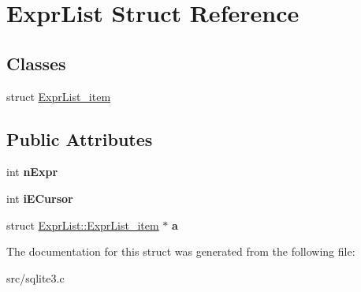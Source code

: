\hypertarget{struct_expr_list}{\section{Expr\-List Struct Reference}
\label{struct_expr_list}
}
\subsection*{Classes}
\begin{DoxyCompactItemize}
\item 
struct \hyperlink{struct_expr_list_1_1_expr_list__item}{Expr\-List\-\_\-item}
\end{DoxyCompactItemize}
\subsection*{Public Attributes}
\begin{DoxyCompactItemize}
\item 
\hypertarget{struct_expr_list_a88bdbd62cce306124eea63ae9f80ec33}{int {\bfseries n\-Expr}}\label{struct_expr_list_a88bdbd62cce306124eea63ae9f80ec33}

\item 
\hypertarget{struct_expr_list_aab870b9af60d25992f8672331d951ca0}{int {\bfseries i\-E\-Cursor}}\label{struct_expr_list_aab870b9af60d25992f8672331d951ca0}

\item 
\hypertarget{struct_expr_list_a02a4222d2dc4da64dcec416188abc16c}{struct \hyperlink{struct_expr_list_1_1_expr_list__item}{Expr\-List\-::\-Expr\-List\-\_\-item} $\ast$ {\bfseries a}}\label{struct_expr_list_a02a4222d2dc4da64dcec416188abc16c}

\end{DoxyCompactItemize}


The documentation for this struct was generated from the following file\-:\begin{DoxyCompactItemize}
\item 
src/sqlite3.\-c\end{DoxyCompactItemize}
